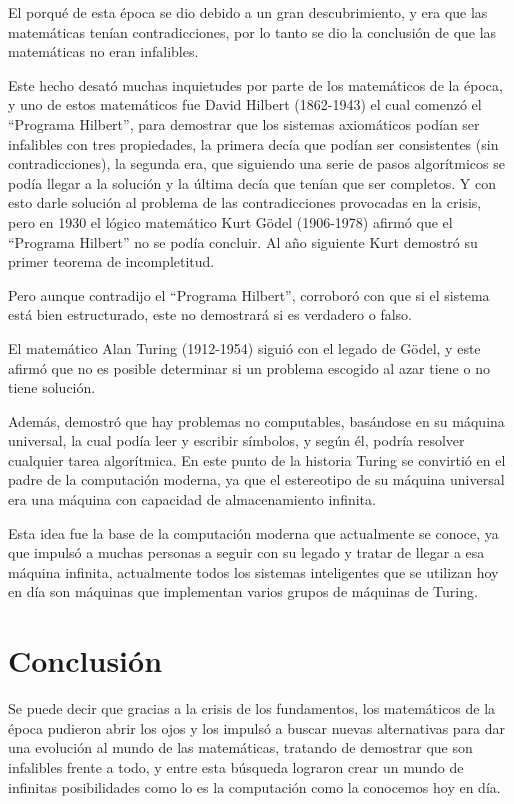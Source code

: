 \documentclass[12pt]{article}
\begin{document}
\vspace{15PT}
El porqué de esta época se dio debido a un gran descubrimiento, y era que las matemáticas tenían contradicciones, por lo tanto se dio la conclusión de que las matemáticas no eran infalibles.

\vspace{15PT}
Este hecho desató muchas inquietudes por parte de los matemáticos de la época, y uno de estos matemáticos fue David Hilbert (1862-1943) el cual comenzó el “Programa Hilbert”, para demostrar que los sistemas axiomáticos podían ser infalibles con tres propiedades, la primera decía que podían ser consistentes (sin contradicciones), la segunda era, que siguiendo una serie de pasos algorítmicos se podía llegar a la solución y la última decía que tenían que ser completos. Y con esto darle solución al problema de las contradicciones provocadas en la crisis, pero en 1930 el lógico matemático Kurt Gödel (1906-1978) afirmó que el “Programa Hilbert” no se podía concluir. Al año siguiente Kurt demostró su primer teorema de incompletitud.

\vspace{15PT}
Pero aunque contradijo el “Programa Hilbert”, corroboró con que si el sistema está bien estructurado, este no demostrará si es verdadero o falso.

\vspace{15PT}
El matemático Alan Turing (1912-1954) siguió con el legado de Gödel, y este afirmó que no es posible determinar  si un problema escogido al azar tiene o no tiene solución.

\vspace{15PT}
 Además, demostró que hay problemas no computables, basándose en su máquina universal, la cual podía leer y escribir símbolos, y según él, podría resolver cualquier tarea algorítmica. En este punto de la historia Turing se convirtió en el padre de la computación moderna, ya que el estereotipo de su máquina universal era una máquina con capacidad de almacenamiento infinita. 
 
\vspace{15PT}
Esta idea fue la base de la computación moderna que actualmente se conoce, ya que impulsó a muchas personas a seguir con su legado y tratar de llegar a esa máquina infinita, actualmente todos los sistemas inteligentes que se utilizan hoy en día son máquinas que implementan varios grupos de máquinas de Turing.


\newpage
\section{Conclusión}
\large
Se puede decir que gracias a la crisis de los fundamentos, los matemáticos de la época pudieron abrir los ojos y los impulsó a buscar nuevas alternativas para dar una evolución al mundo de las matemáticas, tratando de demostrar que son infalibles frente a todo, y entre esta búsqueda lograron crear un mundo de infinitas posibilidades como lo es la computación como la conocemos hoy en día.  
\end{document}
